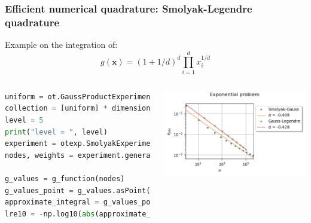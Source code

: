 \documentclass[aspectratio=169]{beamer}
\begin{document}


\begin{frame}[containsverbatim]
\frametitle{Efficient numerical quadrature: Smolyak-Legendre quadrature}

Example on the integration of:
\begin{equation*}
g(\mathbf{x}) = (1+1/d)^d \prod_{i=1}^d x_i^{1/d}
\end{equation*}

  \begin{columns}

\begin{lstlisting}[language=Python, numbers = none]
uniform = ot.GaussProductExperiment(ot.Uniform(0.0, 1.0))
collection = [uniform] * dimension
level = 5
print("level = ", level)
experiment = otexp.SmolyakExperiment(collection, level)
nodes, weights = experiment.generateWithWeights()

g_values = g_function(nodes)
g_values_point = g_values.asPoint()
approximate_integral = g_values_point.dot(weights)
lre10 = -np.log10(abs(approximate_integral - integral) / abs(integral))


\end{lstlisting}


\centering
    \includegraphics[width=1.\textwidth]{figures/Smolyak2.png}
  \end{columns}



\end{frame}

\end{document}
